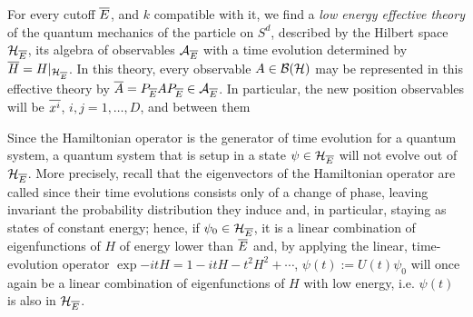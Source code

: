 \begin{remark}
For every cutoff $\overline{E}$, and $k$ compatible with it, we find a \textit{low energy effective theory} of the quantum mechanics of the particle on $S^d$, described by the Hilbert space $\mathcal H_{\overline{E}}$, its algebra of observables $\mathcal A_{\overline{E}}$ with a time evolution determined by $\overline{H} = H|_{\mathcal H_{\overline{E}}}$. In this theory, every observable $A \in \mathcal B(\mathcal H)$ may be represented in this effective theory by $\overline{A} = P_{\overline{E}} A P_{\overline{E}} \in \mathcal A_{\overline{E}}$. In particular, the new position observables will be $\overline{x^i}$, $i, j = 1, \dots, D$, and between them  
\end{remark}

\begin{remark}
Since the Hamiltonian operator is the generator of time evolution for a quantum system, a quantum system that is setup in a state $\psi \in \mathcal H_{\overline{E}}$ will not evolve out of $\mathcal H_{\overline{E}}$. More precisely, recall that the eigenvectors of the Hamiltonian operator are called  since their time evolutions consists only of a change of phase, leaving invariant the probability distribution they induce and, in particular, staying as states of constant energy; 
hence, if $\psi_0 \in \mathcal H_{\overline{E}}$, it is a linear combination of eigenfunctions of $H$ of energy lower than $\overline{E}$ and, by applying the linear, time-evolution operator $\exp{-itH} = 1 - itH - t^2 H^2 + \cdots$, $\psi(t) := U(t) \psi_0$ will once again be a linear combination of eigenfunctions of $H$ with low energy, i.e. $\psi(t)$ is also in $\mathcal H_{\overline{E}}$.
\end{remark}

